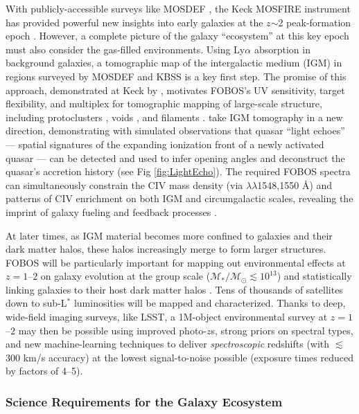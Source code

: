 \documentclass[preprint,11pt]{aastex}
\begin{document}
With publicly-accessible surveys like MOSDEF \citep{kriek15}, the Keck MOSFIRE instrument has provided powerful new
insights into early galaxies at the $z$$\sim$2 peak-formation epoch \citep[also see KBSS,][]{steidel14}. However, a
complete picture of the galaxy ``ecosystem'' at this key epoch must also consider the gas-filled environments. Using
Ly$\alpha$ absorption in background galaxies, a tomographic map of the intergalactic medium (IGM) in regions surveyed
by MOSDEF and KBSS is a key first step. The promise of this approach, demonstrated at Keck by \citet{lee14}, motivates
FOBOS's UV sensitivity, target flexibility, and multiplex for tomographic mapping of large-scale structure, including
protoclusters \citep{lee16,kartaltepe19}, voids \citep{krolewski18}, and filaments \citep{horowitz19}.
\citet{2018arXiv181005156S} take IGM tomography in a new direction, demonstrating with simulated observations that
quasar ``light echoes''
--- spatial signatures of the expanding ionization front of a newly
activated quasar --- can be detected and used to infer opening angles
and deconstruct the quasar's accretion history (see Fig
\ref{fig:LightEcho}). The required FOBOS spectra can simultaneously
constrain the CIV mass density (via $\lambda\lambda$1548,1550 \AA)
and patterns of CIV enrichment on both IGM and circumgalactic scales,
revealing the imprint of galaxy fueling and feedback processes
\citep[e.g.,][]{tumlinson17}.

At later times, as IGM material becomes more confined to galaxies and their dark matter halos, these halos
increasingly merge to form larger structures.  FOBOS will be particularly important for mapping out environmental
effects at $z=1$--$2$ on galaxy evolution at the group scale ($\mathcal{M_\ast/M_\odot} \lesssim 10^{13}$) and
statistically linking galaxies to their host dark matter halos \citep{behroozi19}.  Tens
of thousands of satellites down to sub-L$^*$ luminosities will be mapped and characterized. Thanks to deep, wide-field
imaging surveys, like LSST, a 1M-object environmental survey at $z=1$--$2$ may then be possible using improved
photo-$z$s, strong priors on spectral types, and new machine-learning techniques to deliver {\it spectroscopic}
redshifts (with $\lesssim$300 km/s accuracy) at the lowest signal-to-noise possible (exposure times reduced by factors
of 4--5).

\subsubsection{Science Requirements for the Galaxy Ecosystem}
\end{document}
